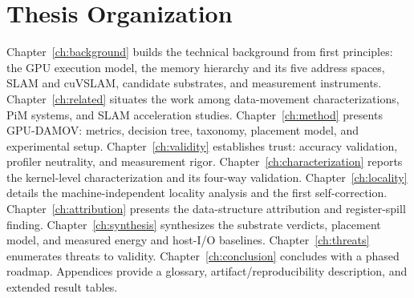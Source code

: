 \section{Thesis Organization}
Chapter~\ref{ch:background} builds the technical background from first principles: the GPU execution model, the memory hierarchy and its five address spaces, SLAM and cuVSLAM, candidate substrates, and measurement instruments. Chapter~\ref{ch:related} situates the work among data-movement characterizations, PiM systems, and SLAM acceleration studies. Chapter~\ref{ch:method} presents GPU-DAMOV: metrics, decision tree, taxonomy, placement model, and experimental setup. Chapter~\ref{ch:validity} establishes trust: accuracy validation, profiler neutrality, and measurement rigor. Chapter~\ref{ch:characterization} reports the kernel-level characterization and its four-way validation. Chapter~\ref{ch:locality} details the machine-independent locality analysis and the first self-correction. Chapter~\ref{ch:attribution} presents the data-structure attribution and register-spill finding. Chapter~\ref{ch:synthesis} synthesizes the substrate verdicts, placement model, and measured energy and host-I/O baselines. Chapter~\ref{ch:threats} enumerates threats to validity. Chapter~\ref{ch:conclusion} concludes with a phased roadmap. Appendices provide a glossary, artifact/reproducibility description, and extended result tables.